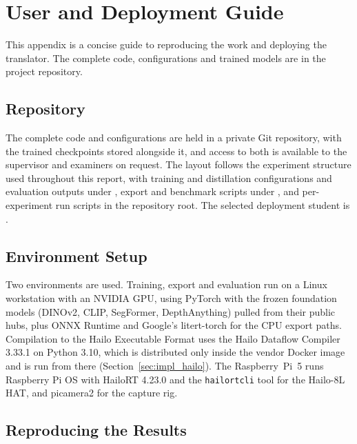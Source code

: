 \doublespacing %

\chapter{User and Deployment Guide}
\label{app:userguide}

\thesisspacing %

This appendix is a concise guide to reproducing the work and deploying the translator. The complete code, configurations and trained models are in the project repository.

\section{Repository}
\label{app:repo}

The complete code and configurations are held in a private Git repository, with the trained checkpoints stored alongside it, and access to both is available to the supervisor and examiners on request. The layout follows the experiment structure used throughout this report, with training and distillation configurations and evaluation outputs under , export and benchmark scripts under , and per-experiment run scripts in the repository root. The selected deployment student is .



\section{Environment Setup}
\label{app:setup}

Two environments are used. Training, export and evaluation run on a Linux workstation with an NVIDIA GPU, using PyTorch with the frozen foundation models (DINOv2, CLIP, SegFormer, DepthAnything) pulled from their public hubs, plus ONNX Runtime and Google's litert-torch for the CPU export paths. Compilation to the Hailo Executable Format uses the Hailo Dataflow Compiler 3.33.1 on Python 3.10, which is distributed only inside the vendor Docker image and is run from there (Section~\ref{sec:impl_hailo}). The Raspberry~Pi~5 runs Raspberry Pi OS with HailoRT 4.23.0 and the \texttt{hailortcli} tool for the Hailo-8L HAT, and picamera2 for the capture rig.


\section{Reproducing the Results}
\label{app:reproduce}

